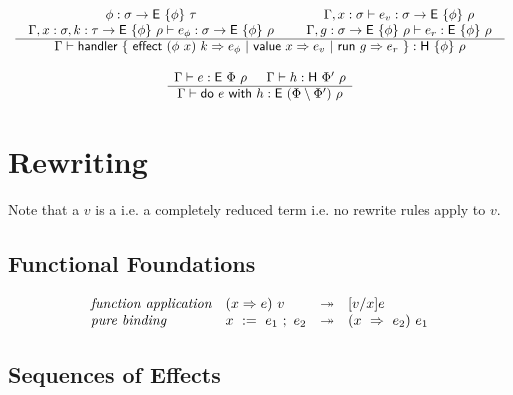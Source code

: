 \documentclass{article}
\begin{document}
\[ \begin{array}{cc}

  \begin{array}{c} 
   \begin{array}{c}
    \phi : \sigma \rightarrow \textsf{E} ~ \{ \phi \} ~ \tau
    \\
    \Gamma, x:\sigma, k:\tau \rightarrow \textsf{E} ~ \{ \phi \} ~ \rho
    \vdash e_\phi:\sigma \rightarrow \textsf{E} ~ \{ \phi \} ~ \rho
   \end{array}
   \hspace{1.5em}
   \begin{array}{c}
    \Gamma, x:\sigma \vdash e_v:\sigma \rightarrow \textsf{E} ~ \{ \phi \} ~ \rho
    \\
    \Gamma, g:\sigma \rightarrow \textsf{E} ~ \{ \phi \} ~ \rho \vdash e_r:\textsf{E} ~ \{ \phi \} ~ \rho
   \end{array}
   \\ \hline 
   \Gamma \vdash
   \textsf{handler} ~ \{ ~
   \textsf{effect} ~ (\phi ~ x) ~ k \Rightarrow e_\phi ~ | ~
   \textsf{value} ~ x \Rightarrow e_v ~ | ~
   \textsf{run} ~ g \Rightarrow e_r
   ~ \} :
   \textsf{H} ~ \{ \phi \} ~ \rho
   \end{array}

  \\\\

  \begin{array}{c} 
   \Gamma \vdash e:\textsf{E} ~ \Phi ~ \rho
   \hspace{1.5em}
   \Gamma \vdash h:\textsf{H} ~ \Phi' ~ \rho
   \\ \hline 
   \Gamma \vdash
   \textsf{do} ~ e ~ \textsf{with} ~ h : \textsf{E} ~ (\Phi \setminus \Phi') ~ \rho
   \end{array}
 \end{array} \]

\newpage
\section{Rewriting}

Note that a $v$ is a 
i.e. a completely reduced term
i.e. no rewrite rules apply to $v$.

\subsection{Functional Foundations}

\[ \begin{array}{llcl}
    \textit{function application} &
      (x \Rightarrow e)~v &\twoheadrightarrow& [v/x] e
    \\
    \textit{pure binding} &
      x~:=~e_1~;~e_2 &\twoheadrightarrow& (x~\Rightarrow~e_2)~e_1
\end{array} \]

\subsection{Sequences of Effects}
\end{document}
